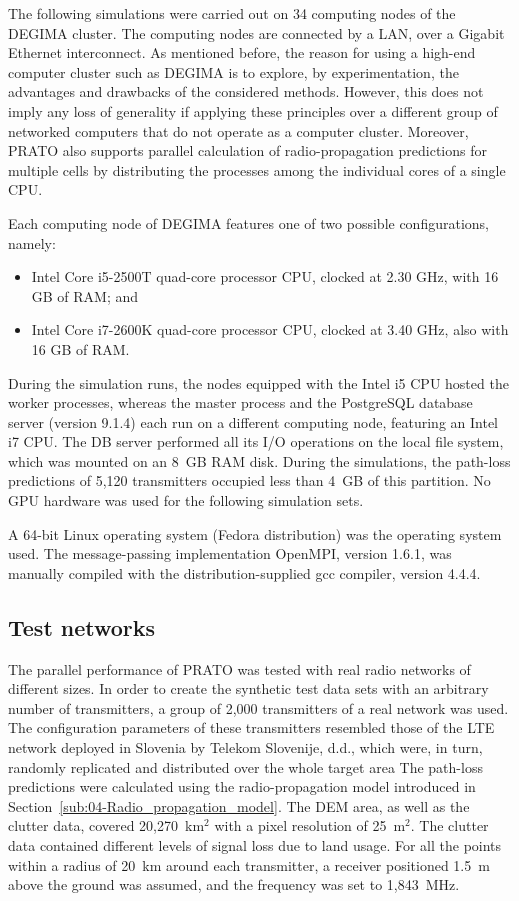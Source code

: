 The following simulations were carried out on 34 computing nodes of
the DEGIMA cluster. The computing nodes are connected by a LAN, over
a Gigabit Ethernet interconnect. As mentioned before, the reason for
using a high-end computer cluster such as DEGIMA is to explore, by
experimentation, the advantages and drawbacks of the considered methods.
However, this does not imply any loss of generality if applying these
principles over a different group of networked computers that do not
operate as a computer cluster. Moreover, PRATO also supports parallel
calculation of radio-propagation predictions for multiple cells by
distributing the processes among the individual cores of a single
CPU.

Each computing node of DEGIMA features one of two possible configurations,
namely:
\begin{itemize}
\item Intel Core i5-2500T quad-core processor CPU, clocked at 2.30 GHz,
with 16 GB of RAM; and
\item Intel Core i7-2600K quad-core processor CPU, clocked at 3.40 GHz,
also with 16 GB of RAM.
\end{itemize}
During the simulation runs, the nodes equipped with the Intel i5 CPU
hosted the worker processes, whereas the master process and the PostgreSQL
database server (version 9.1.4) each run on a different computing
node, featuring an Intel i7 CPU. The DB server performed all its I/O
operations on the local file system, which was mounted on an 8~GB
RAM disk. During the simulations, the path-loss predictions of 5,120
transmitters occupied less than 4~GB of this partition. No GPU hardware
was used for the following simulation sets.

A 64-bit Linux operating system (Fedora distribution) was the operating
system used. The message-passing implementation OpenMPI, version 1.6.1,
was manually compiled with the distribution-supplied gcc compiler,
version 4.4.4.


\subsection{Test networks}

The parallel performance of PRATO was tested with real radio networks
of different sizes. In order to create the synthetic test data sets
with an arbitrary number of transmitters, a group of 2,000 transmitters
of a real network was used. The configuration parameters of these
transmitters resembled those of the LTE network deployed in Slovenia
by Telekom Slovenije, d.d., which were, in turn, randomly replicated
and distributed over the whole target area The path-loss predictions
were calculated using the radio-propagation model introduced in Section~\ref{sub:04-Radio_propagation_model}.
The DEM area, as well as the clutter data, covered 20,270~km$^{2}$
with a pixel resolution of 25~m$^{2}$. The clutter data contained
different levels of signal loss due to land usage. For all the points
within a radius of 20~km around each transmitter, a receiver positioned
1.5~m above the ground was assumed, and the frequency was set to
1,843~MHz.


